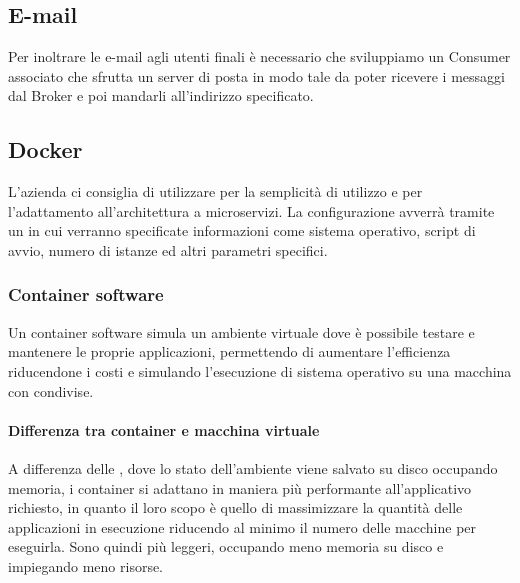 		\subsection{E-mail}
		Per inoltrare le e-mail agli utenti finali è necessario che sviluppiamo un Consumer associato che sfrutta un server di posta
        in modo tale da poter ricevere i messaggi dal Broker e poi mandarli all'indirizzo specificato.
		
		\subsection{Docker}
		L'azienda ci consiglia di utilizzare  per la semplicità di utilizzo e per l'adattamento all'architettura a microservizi.
		La configurazione avverrà tramite un  in cui verranno specificate informazioni come sistema operativo, script di avvio,
        numero di istanze ed altri parametri specifici.
        
        \subsubsection{Container software}\label{TecnologieContainer}
        
        Un container software simula un ambiente virtuale dove è possibile testare e mantenere le proprie applicazioni, permettendo di aumentare l'efficienza riducendone i costi e simulando l'esecuzione di sistema operativo su una macchina con  condivise.
        
        \paragraph{Differenza tra container e macchina virtuale}
        A differenza delle , dove lo stato dell'ambiente viene salvato su disco occupando memoria, i container si adattano in maniera più performante all'applicativo richiesto, in quanto il loro scopo è quello di massimizzare la quantità delle applicazioni in esecuzione riducendo al minimo il numero delle macchine per eseguirla.
        Sono quindi più leggeri, occupando meno memoria su disco e impiegando meno risorse.
        
			